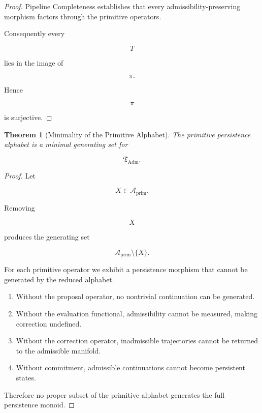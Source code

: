 \documentclass[11pt]{book}
\numberwithin{equation}{chapter}
\theoremstyle{definition}
\theoremstyle{plain}
\newtheorem{theorem}[definition]{Theorem}
\begin{document}
\begin{proof}

Pipeline Completeness establishes that every admissibility-preserving
morphism factors through the primitive operators.

Consequently every

\[
T
\]

lies in the image of

\[
\pi.
\]

Hence

\[
\pi
\]

is surjective.

\end{proof}

\begin{theorem}[Minimality of the Primitive Alphabet]

The primitive persistence alphabet is a minimal generating set for

\[
\mathfrak T_{\operatorname{Adm}}.
\]

\end{theorem}

\begin{proof}

Let

\[
X
\in
\mathcal A_{\mathrm{prim}}.
\]

Removing

\[
X
\]

produces the generating set

\[
\mathcal A_{\mathrm{prim}}
\setminus
\{X\}.
\]

For each primitive operator we exhibit a persistence morphism that
cannot be generated by the reduced alphabet.

\begin{enumerate}

\item
Without the proposal operator, no nontrivial continuation can be
generated.

\item
Without the evaluation functional, admissibility cannot be measured,
making correction undefined.

\item
Without the correction operator, inadmissible trajectories cannot be
returned to the admissible manifold.

\item
Without commitment, admissible continuations cannot become persistent
states.

\end{enumerate}

Therefore no proper subset of the primitive alphabet generates the full
persistence monoid.

\end{proof}
\end{document}
